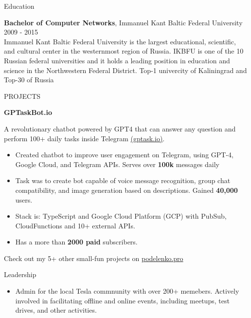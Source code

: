 \documentclass{template} %
\begin{document}

\begin{rSection}{Education}

{\bf Bachelor of Computer Networks}, Immanuel Kant Baltic Federal University \hfill {2009 - 2015} \vspace{0.2cm}\\
Immanuel Kant Baltic Federal University is the largest educational, scientific, and cultural center in the westernmost region of Russia. IKBFU is one of the 10 Russian federal universities and it holds a leading position in education and science in the Northwestern Federal District.
Top-1 univercity of Kaliningrad and Top-30 of Russia \\

\end{rSection}


\begin{rSection}{PROJECTS}
\vspace{-1.25em}
\item \textbf{GPTaskBot.io} {A revolutionary chatbot powered by GPT4 that can answer any question and perform 100+ daily tasks inside Telegram \href{https://gptask.io/}{(gptask.io)}.
    \begin{itemize}
        \itemsep-3pt {} 
        \item Created chatbot to improve user engagement on Telegram, using GPT-4, Google Cloud, and Telegram APIs. Serves over \textbf{100k} messages daily
        \item Task was to create bot capable of voice message recognition, group chat compatibility, and image generation based on descriptions. Gained \textbf{40,000} users.
        \item Stack is: TypeScript and Google Cloud Platform (GCP) with PubSub, CloudFunctions and 10+ external APIs.
        \item Has a more than \textbf{2000 paid} subscribers.
    \end{itemize}
}
Check out my 5+ other small-fun projects on \href{https://podelenko.pro/#fun}{podelenko.pro}
\end{rSection} 


\begin{rSection}{Leadership} 
\begin{itemize}
    \item Admin for the local Tesla commnunity with over 200+ memebers. Actively involved in facilitating offline and online events, including meetups, test drives, and other activities.
\end{itemize}


\end{rSection}
\end{document}
